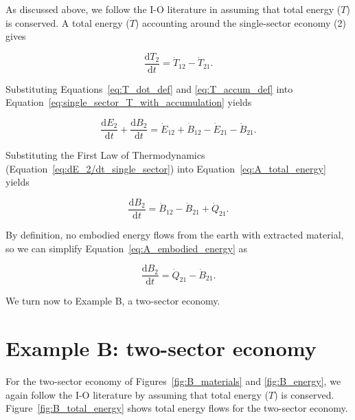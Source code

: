 As discussed above, we follow the I-O literature in assuming that 
total energy ($T$) is conserved. 
A total energy ($\dot{T}$) accounting around the 
single-sector economy (2) gives

\begin{equation} \label{eq:single_sector_T_with_accumulation}
	\frac{\mathrm{d}T_{2}}{\mathrm{d}t} 
	= \dot{T}_{12} 
	- \dot{T}_{21}.
\end{equation}

Substituting Equations~\ref{eq:T_dot_def} and
\ref{eq:T_accum_def} into 
Equation~\ref{eq:single_sector_T_with_accumulation}
yields

\begin{equation} \label{eq:A_total_energy}
	\frac{\mathrm{d}E_{2}}{\mathrm{d}t} 
	+ \frac{\mathrm{d}B_{2}}{\mathrm{d}t} 
	= \dot{E}_{12} 
	+ \dot{B}_{12} 
	- \dot{E}_{21}
	- \dot{B}_{21}.	
\end{equation}

Substituting the First Law of Thermodynamics 
(Equation~\ref{eq:dE_2/dt_single_sector}) 
into Equation~\ref{eq:A_total_energy} yields

\begin{equation} \label{eq:A_embodied_energy}
	\frac{\mathrm{d}B_{2}}{\mathrm{d}t} 
	= \dot{B}_{12} 
	- \dot{B}_{21}
	+ \dot{Q}_{21}.
\end{equation}

By definition, no embodied energy flows from 
the earth with extracted material, so we can 
simplify Equation~\ref{eq:A_embodied_energy}
as

\begin{equation} \label{eq:A_embodied_energy_2}
	\frac{\mathrm{d}B_{2}}{\mathrm{d}t} 
	= \dot{Q}_{21} 
	- \dot{B}_{21}.
\end{equation}

We turn now to Example B, a two-sector economy.


\section{Example B: two-sector economy}

For the two-sector economy of Figures~\ref{fig:B_materials}
and \ref{fig:B_energy}, we again follow the I-O literature 
by assuming that total energy ($T$) is conserved. 
Figure~\ref{fig:B_total_energy} shows total energy
flows for the two-sector economy.

